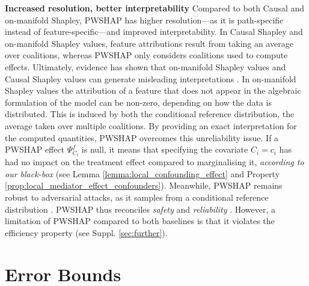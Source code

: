 \documentclass{article}
\theoremstyle{plain}
\theoremstyle{definition}
\theoremstyle{remark}
\newcommand{\effect}{\Psi}
\theoremstyle{mystyle}
\begin{document}
\textbf{Increased resolution, better interpretability}
Compared to both Causal and on-manifold Shapley, PWSHAP has higher resolution---as it is path-specific instead of feature-specific---and improved interpretability. In Causal Shapley and on-manifold Shapley values, feature attributions result from taking an average over coalitions, whereas PWSHAP only considers coalitions used to compute effects. Ultimately, evidence has shown that on-manifold Shapley values and Causal Shapley values can generate misleading interpretations . In on-manifold Shapley values the attribution of a feature that does not appear in the algebraic formulation of the model can be non-zero, depending on how the data is distributed. This is induced by both the conditional reference distribution, the average taken over multiple coalitions. By providing an exact interpretation for the computed quantities, PWSHAP overcomes this unreliability issue. If a PWSHAP effect $\effect^f_{C_i}$ is null, it means that specifying the covariate $C_i=c_i$ has had no impact on the treatment effect compared to marginalising it, \emph{according to our black-box} (see Lemma \ref{lemma:local_confounding_effect} and
Property \ref{prop:local_mediator_effect_confounders}). Meanwhile, PWSHAP remains robust to adversarial attacks, as it samples from a conditional reference distribution . PWSHAP thus reconciles \textit{safety} and \textit{reliability}%
. However, a limitation of PWSHAP compared to both baselines is that it violates the efficiency property (see Suppl. \ref{sec:further}).


\section{Error Bounds} 
\end{document}
